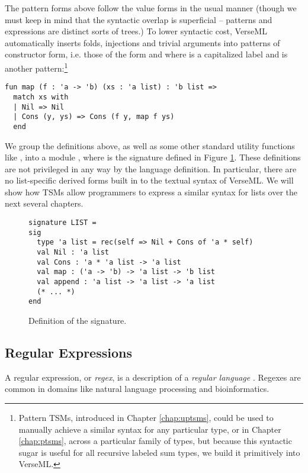The pattern forms above follow the value forms in the usual manner (though we must keep in mind that the syntactic overlap is superficial -- patterns and expressions are distinct sorts of trees.) To lower syntactic cost, VerseML automatically inserts folds, injections and trivial arguments into patterns of constructor form, i.e. those of the form  and  where  is a capitalized label and  is another pattern:\footnote{Pattern TSMs, introduced in Chapter \ref{chap:uptsms}, could be used to manually achieve a similar syntax for any particular type, or in Chapter \ref{chap:ptsms}, across a particular family of types, but because this syntactic sugar is useful for all recursive labeled sum types, we build it primitively into VerseML.}
\begin{lstlisting}[numbers=none]
fun map (f : 'a -> 'b) (xs : 'a list) : 'b list => 
  match xs with 
  | Nil => Nil 
  | Cons (y, ys) => Cons (f y, map f ys)
  end
\end{lstlisting}

We group the definitions above, as well as some other standard utility functions like , into a module , where  is the signature defined in Figure \ref{fig:LIST}. These definitions are not privileged in any way by the language definition. In particular, there are no list-specific derived forms built in to the textual syntax of VerseML. We will show how TSMs allow programmers to express a similar syntax for lists over the next several chapters.

\begin{figure}
\begin{lstlisting}[numbers=none]
signature LIST = 
sig 
  type 'a list = rec(self => Nil + Cons of 'a * self)
  val Nil : 'a list
  val Cons : 'a * 'a list -> 'a list
  val map : ('a -> 'b) -> 'a list -> 'b list
  val append : 'a list -> 'a list -> 'a list
  (* ... *)
end
\end{lstlisting}
\caption{Definition of the  signature.}
\label{fig:LIST}
\end{figure}

\subsection{Regular Expressions}\label{sec:syntax-examples-regexps}
A regular expression, or \emph{regex}, is a description of a \emph{regular language} \cite{Thompson:1968:PTR:363347.363387}. Regexes are common in domains like natural language processing and bioinformatics.

